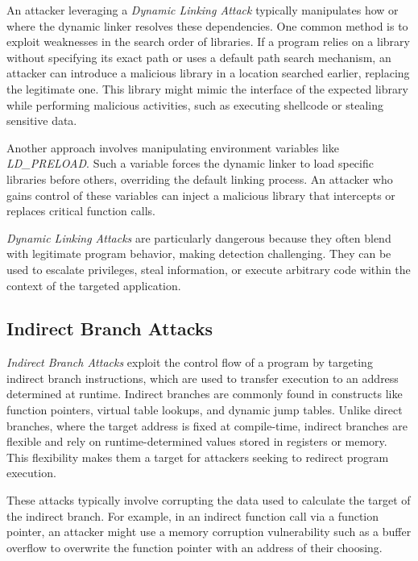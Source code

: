 An attacker leveraging a \textit{Dynamic Linking Attack} typically manipulates
how or where the dynamic linker resolves these dependencies. One common method is
to exploit weaknesses in the search order of libraries. If a program relies on a
library without specifying its exact path or uses a default path search
mechanism, an attacker can introduce a malicious library in a location searched earlier,
replacing the legitimate one. This library might mimic the interface of the expected
library while performing malicious activities, such as executing shellcode or
stealing sensitive data.

Another approach involves manipulating environment variables like \textit{LD\_PRELOAD}.
Such a variable forces the dynamic linker to load specific libraries before
others, overriding the default linking process. An attacker who gains control of
these variables can inject a malicious library that intercepts or replaces
critical function calls.

\textit{Dynamic Linking Attacks} are particularly dangerous because they often blend
with legitimate program behavior, making detection challenging. They can be used
to escalate privileges, steal information, or execute arbitrary code within the context
of the targeted application.

\subsection{Indirect Branch Attacks}
\label{subsec:background_indirectbranch}

\textit{Indirect Branch Attacks} exploit the control flow of a program by targeting
indirect branch instructions, which are used to transfer execution to an address
determined at runtime. Indirect branches are commonly found in constructs like function
pointers, virtual table lookups, and dynamic jump tables. Unlike direct branches,
where the target address is fixed at compile-time, indirect branches are
flexible and rely on runtime-determined values stored in registers or memory. This
flexibility makes them a target for attackers seeking to redirect program execution.

These attacks typically involve corrupting the data used to calculate the target
of the indirect branch. For example, in an indirect function call via a function
pointer, an attacker might use a memory corruption vulnerability such as a
buffer overflow to overwrite the function pointer with an address of their
choosing.

